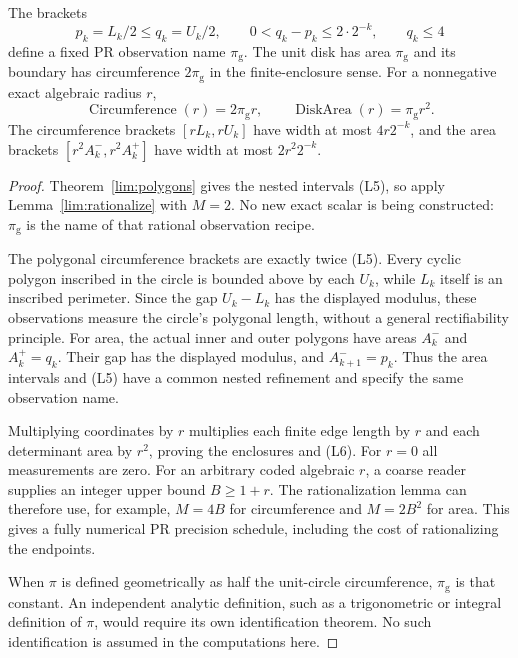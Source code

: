 \begin{theorem}
\label{lim:circle}
The brackets
\[
 p_k=L_k/2\le q_k=U_k/2,
 \qquad 0<q_k-p_k\le2\cdot2^{-k},\qquad q_k\le4       \tag{L5}
\]
define a fixed PR observation name $\pi_{\mathrm g}$.
The unit disk has area $\pi_{\mathrm g}$ and its boundary has
circumference $2\pi_{\mathrm g}$ in the finite-enclosure sense.
For a nonnegative exact algebraic radius $r$,
\[
 \operatorname{Circumference}(r)=2\pi_{\mathrm g}r,
 \qquad \operatorname{DiskArea}(r)=\pi_{\mathrm g}r^2.              \tag{L6}
\]
The circumference brackets $[rL_k,rU_k]$ have width at most
$4r2^{-k}$, and the area brackets $[r^2A_k^-,r^2A_k^+]$ have width at
most $2r^2 2^{-k}$.
\end{theorem}
\begin{proof}
Theorem~\ref{lim:polygons} gives the nested intervals (L5), so apply
Lemma~\ref{lim:rationalize} with $M=2$.
No new exact scalar is being constructed: $\pi_{\mathrm g}$ is the name
of that rational observation recipe.

The polygonal circumference brackets are exactly twice (L5).
Every cyclic polygon inscribed in the circle is bounded above by each
$U_k$, while $L_k$ itself is an inscribed perimeter. Since the gap
$U_k-L_k$ has the displayed modulus, these observations measure the
circle's polygonal length, without a general rectifiability principle.
For area, the actual inner and outer polygons have areas
$A_k^-$ and $A_k^+=q_k$. Their gap has the displayed modulus, and
$A_{k+1}^-=p_k$. Thus the area intervals and (L5) have a common nested
refinement and specify the same observation name.

Multiplying coordinates by $r$ multiplies each finite edge length by
$r$ and each determinant area by $r^2$, proving the enclosures and (L6).
For $r=0$ all measurements are zero. For an arbitrary coded algebraic
$r$, a coarse reader supplies an integer upper bound $B\ge1+r$.
The rationalization lemma can therefore use, for example, $M=4B$ for
circumference and $M=2B^2$ for area. This gives a fully numerical PR
precision schedule, including the cost of rationalizing the endpoints.

When $\pi$ is defined geometrically as half the unit-circle circumference,
$\pi_{\mathrm g}$ is that constant. An independent analytic definition,
such as a trigonometric or integral definition of $\pi$, would require
its own identification theorem. No such identification is assumed in
the computations here.
\end{proof}


